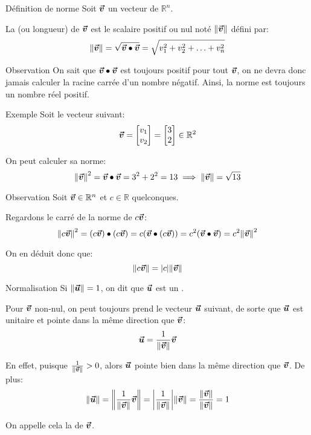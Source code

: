 \documentclass[a4paper]{article}
\begin{document}
\begin{parag}{Définition de norme}
    Soit $\bm{\protect\vec{v}}$ un vecteur de $\mathbb{R}^{n}$.

    La  (ou longueur) de $\bm{\protect\vec{v}}$ est le scalaire positif ou nul noté $\left\|\bvec{v}\right\|$ défini par: 
    \[\left\|\bvec{v}\right\| = \sqrt{\bvec{v} \dotprod \bvec{v}} = \sqrt{v_1^2 + v_2^2 + \ldots + v_n^2}\]
    
    \begin{subparag}{Observation}
        On sait que $\bm{\protect\vec{v}} \bullet \bm{\protect\vec{v}}$ est toujours positif pour tout $\bm{\protect\vec{v}}$, on ne devra donc jamais calculer la racine carrée d'un nombre négatif. Ainsi, la norme est toujours un nombre réel positif.
    \end{subparag}
\end{parag}

\begin{parag}{Exemple}
    Soit le vecteur suivant: 
    \[\bm{\protect\vec{v}} = \begin{bmatrix} v_1 \\ v_2 \end{bmatrix} = \begin{bmatrix} 3 \\ 2 \end{bmatrix} \in \mathbb{R}^2\]
    
    On peut calculer sa norme: 
    \[\left\|\bvec{v}\right\|^2 = \bvec{v} \dotprod \bvec{v} = 3^2 + 2^2 = 13 \implies \left\|\bvec{v}\right\| = \sqrt{13}\]
\end{parag}

\begin{parag}{Observation}
    Soit $\bm{\protect\vec{v}} \in \mathbb{R}^{n}$ et $c \in \mathbb{R}$ quelconques. 

    Regardons le carré de la norme de $c \bm{\protect\vec{v}}$: 
    \[\left\|c \bvec{v}\right\|^2 = \left(c \bvec{v}\right)\dotprod\left(c \bvec{v}\right) = c\left(\bvec{v} \dotprod \left(c \bvec{v}\right)\right) = c^2 \left(\bvec{v} \dotprod \bvec{v}\right) = c^2 \left\|\bvec{v}\right\|^2\]
    
    On en déduit donc que: 
    \[\left\|c \bvec{v}\right\| = \left|c\right| \left\|\bvec{v}\right\|\]
\end{parag}

\begin{parag}{Normalisation}
    Si $\left\|\bvec{u}\right\| = 1$, on dit que $\bm{\protect\vec{u}}$ est un .

    Pour $\bm{\protect\vec{v}}$ non-nul, on peut toujours prend le vecteur $\bm{\protect\vec{u}}$ suivant, de sorte que $\bm{\protect\vec{u}}$ est unitaire et pointe dans la même direction que $\bm{\protect\vec{v}}$: 
    \[\bvec{u} = \frac{1}{\left\|\bvec{v}\right\|}\bvec{v}\]
    
    En effet, puisque $\frac{1}{\left\|\bvec{v}\right\|} > 0$, alors $\bm{\protect\vec{u}}$ pointe bien dans la même direction que $\bm{\protect\vec{v}}$. De plus:
    \[\left\|\bvec{u}\right\| = \left\|\frac{1}{\left\|\bvec{v}\right\|} \bvec{v}\right\| = \left|\frac{1}{\left\|\bvec{v}\right\|}\right| \left\|\bvec{v}\right\| = \frac{\left\|\bvec{v}\right\|}{\left\|\bvec{v}\right\|} = 1\]


    On appelle cela la  de $\bm{\protect\vec{v}}$.
\end{parag}
\end{document}
